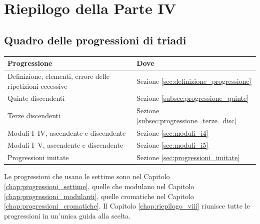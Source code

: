 \chapter{Riepilogo della Parte IV}
\label{chap:riepilogo_iv}

\section{Quadro delle progressioni di triadi}
\label{sec:quadro_progressioni_triadi}

\begin{center}
\small
\begin{tabular}{p{5.2cm}p{6.8cm}}
\toprule
\textbf{Progressione} & \textbf{Dove} \\
\midrule
Definizione, elementi, errore delle ripetizioni eccessive & Sezione \ref{sec:definizione_progressione} \\
Quinte discendenti & Sezione \ref{subsec:progressione_quinte} \\
Terze discendenti & Sezione \ref{subsec:progressione_terze_disc} \\
Moduli I--IV, ascendente e discendente & Sezione \ref{sec:moduli_i4} \\
Moduli I--V, ascendente e discendente & Sezione \ref{sec:moduli_i5} \\
Progressioni imitate & Sezione \ref{sec:progressioni_imitate} \\
\bottomrule
\end{tabular}
\end{center}

Le progressioni che usano le settime sono nel Capitolo \ref{chap:progressioni_settime}, quelle che modulano nel Capitolo \ref{chap:progressioni_modulanti}, quelle cromatiche nel Capitolo \ref{chap:progressioni_cromatiche}. Il Capitolo \ref{chap:riepilogo_viii} riunisce tutte le progressioni in un'unica guida alla scelta.
